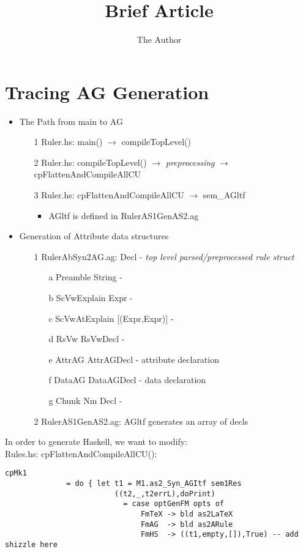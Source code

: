 \documentclass[10pt]{report}
\title{Brief Article}
\author{The Author}
\begin{document}
\section{Tracing AG Generation}
\begin{itemize}
  \item The Path from main to AG
    \begin{itemize}
      \item[1] Ruler.hs: main() $\rightarrow$ compileTopLevel()
      \item[2] Ruler.hs: compileTopLevel() $\rightarrow$ \emph{preprocessing} $\rightarrow$ cpFlattenAndCompileAllCU
      \item[3] Ruler.hs: cpFlattenAndCompileAllCU $\rightarrow$ sem\_AGltf
        \begin{itemize}
          \item AGltf is defined in RulerAS1GenAS2.ag
        \end{itemize}
    \end{itemize}
    \item Generation of Attribute data structures
        \begin{itemize}
          \item[1] RulerAbSyn2AG.ag: Decl - \emph{top level parsed/preprocessed rule struct}
            \begin{itemize}
              \item[a] Preamble String - 
              \item[b] ScVwExplain Expr - 
              \item[c] ScVwAtExplain [(Expr,Expr)] -
              \item[d] RsVw RsVwDecl - 
              \item[e] AttrAG AttrAGDecl - attribute declaration
              \item[f]  DataAG DataAGDecl - data declaration
              \item[g] Chunk Nm Decl - 
            \end{itemize}
          \item[2] RulerAS1GenAS2.ag: AGltf generates an array of decls
        \end{itemize}
\end{itemize}


In order to generate Haskell, we want to modify:\\ 
Rules.hs: cpFlattenAndCompileAllCU():\\
\begin{verbatim}
cpMk1
              = do { let t1 = M1.as2_Syn_AGItf sem1Res
                         ((t2,_,t2errL),doPrint)
                           = case optGenFM opts of
                               FmTeX -> bld as2LaTeX
                               FmAG  -> bld as2ARule
                               FmHS  -> ((t1,empty,[]),True) -- add shizzle here
\end{verbatim}
\end{document}
